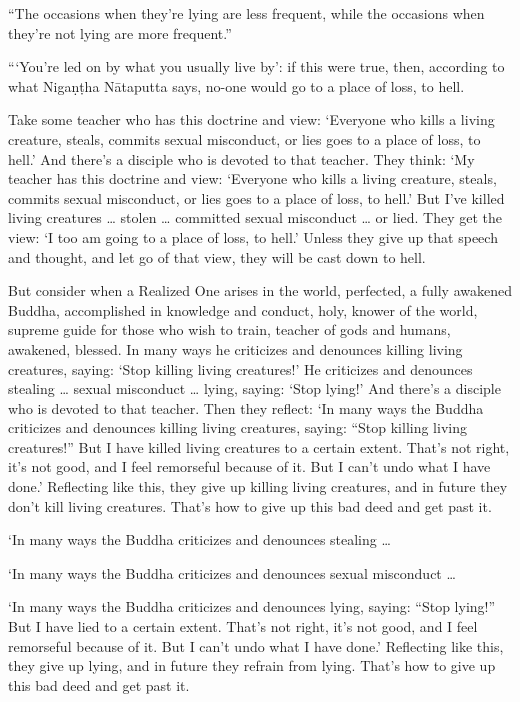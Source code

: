 \documentclass[12pt,openany]{book}%
\begin{document}
“The occasions when they’re lying are less frequent, while the occasions when they’re not lying are more frequent.” 

“‘You’re led on by what you usually live by’: if this were true, then, according to what \textsanskrit{Nigaṇṭha} \textsanskrit{Nātaputta} says, no-one would go to a place of loss, to hell. 

Take some teacher who has this doctrine and view: ‘Everyone who kills a living creature, steals, commits sexual misconduct, or lies goes to a place of loss, to hell.’ And there’s a disciple who is devoted to that teacher. They think: ‘My teacher has this doctrine and view: ‘Everyone who kills a living creature, steals, commits sexual misconduct, or lies goes to a place of loss, to hell.’ But I’ve killed living creatures … stolen … committed sexual misconduct … or lied. They get the view: ‘I too am going to a place of loss, to hell.’ Unless they give up that speech and thought, and let go of that view, they will be cast down to hell. 

But consider when a Realized One arises in the world, perfected, a fully awakened Buddha, accomplished in knowledge and conduct, holy, knower of the world, supreme guide for those who wish to train, teacher of gods and humans, awakened, blessed. In many ways he criticizes and denounces killing living creatures, saying: ‘Stop killing living creatures!’ He criticizes and denounces stealing … sexual misconduct … lying, saying: ‘Stop lying!’ And there’s a disciple who is devoted to that teacher. Then they reflect: ‘In many ways the Buddha criticizes and denounces killing living creatures, saying: “Stop killing living creatures!” But I have killed living creatures to a certain extent. That’s not right, it’s not good, and I feel remorseful because of it. But I can’t undo what I have done.’ Reflecting like this, they give up killing living creatures, and in future they don’t kill living creatures. That’s how to give up this bad deed and get past it. 

‘In many ways the Buddha criticizes and denounces stealing … 

‘In many ways the Buddha criticizes and denounces sexual misconduct … 

‘In many ways the Buddha criticizes and denounces lying, saying: “Stop lying!” But I have lied to a certain extent. That’s not right, it’s not good, and I feel remorseful because of it. But I can’t undo what I have done.’ Reflecting like this, they give up lying, and in future they refrain from lying. That’s how to give up this bad deed and get past it. 
\end{document}
